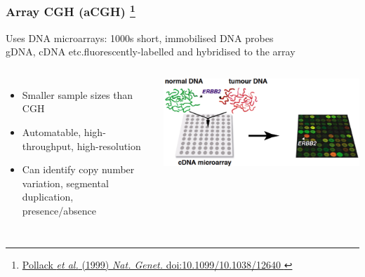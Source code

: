 %
\begin{frame}
  \frametitle{Array CGH (aCGH)
  \footnote{\tiny{\href{http://dx.doi.org/10.1038/12640
}{Pollack \textit{et al.} (1999) \textit{Nat. Genet.} doi:10.1099/10.1038/12640
}}}
  }
  Uses DNA microarrays: 1000s short, immobilised DNA probes \\
  gDNA, cDNA etc.\textcolor{RawSienna}{fluorescently}-\textcolor{hutton_green}{labelled} and hybridised to the array\\
  \begin{columns}[c] 
      \begin{itemize}
        \item Smaller sample sizes than CGH
        \item \textcolor{hutton_blue}{Automatable, high-throughput, high-resolution}
        \item \textcolor{hutton_purple}{Can identify copy number variation, segmental duplication, presence/absence}
      \end{itemize}
      \includegraphics[width=\textwidth]{images/array_cgh}
  \end{columns}   
\end{frame}
